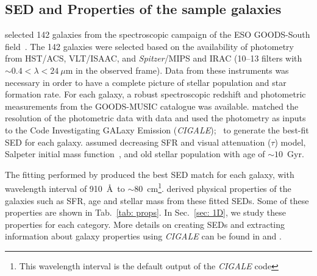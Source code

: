  \subsection{SED and Properties of the sample galaxies} 
     selected 142 galaxies from the spectroscopic campaign of the ESO GOODS-South field~\citep{Vanzella05, Vanzella06, Vanzella08}.
    The 142 galaxies were selected based on the availability of photometry from HST/ACS, VLT/ISAAC, and {\it Spitzer}/MIPS and IRAC (10--13 filters with $\sim 0.4<\lambda<24~\mu$m in the observed frame).
   Data from these instruments was necessary in order to have a complete picture of stellar population and star formation rate. 
    For each galaxy, a robust spectroscopic redshift and photometric measurements from the GOODS-MUSIC catalogue \citep{Santini09} was available.
    matched the resolution of the photometric data with  data and used the photometry as inputs to the Code Investigating GALaxy Emission ({\em CIGALE});~\citep[][hereafter N09]{Noll09} to generate the best-fit SED for each galaxy. %
    assumed decreasing SFR and visual attenuation ($\tau$) model, Salpeter initial mass function~\citep{Salpeter55}, and old stellar population with age of $\sim 10$~Gyr.%
   

    The fitting performed by  produced the best SED match for each galaxy, with wavelength interval of 910~\AA~to $\sim 80$~cm\footnote{This wavelength interval is the default output of the {\em CIGALE} code}.
     derived physical properties of the galaxies such as SFR, age and stellar mass from these fitted SEDs. %
    Some of these properties are shown in Tab.~\ref{tab: props}.
    In Sec.~\ref{sec: 1D}, we study these properties for each category.
    More details on creating SEDs and extracting information about galaxy properties using {\em CIGALE} can be found in  and .
    
